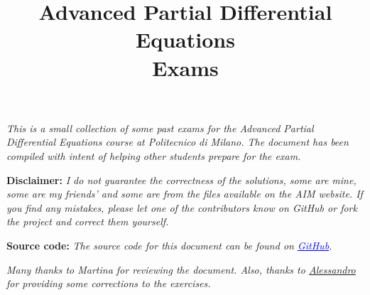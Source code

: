 \documentclass[a4paper,12pt]{article}
\begin{document}
\title{\textbf{Advanced Partial Differential Equations \\ Exams}}
\author{}
\date{}
\maketitle

\noindent\textit{This is a small collection of some past exams for the Advanced Partial Differential Equations course 
at Politecnico di Milano. The document has been compiled with intent of helping other students prepare for the exam.}

\vspace{0.5cm}

\textbf{Disclaimer:}
\textit{
I do not guarantee the correctness of the solutions, some are mine, some are my friends' and 
some are from the files available on the AIM website. If you find any mistakes, 
please let one of the contributors know on GitHub or fork the project and correct them yourself.}

\vspace{0.5cm}

\textbf{Source code:}
\textit{
The source code for this document can be found on \href{https://github.com/itsmebonny/APDE_Exams}{\textcolor{blue}{\underline{GitHub}}}.} 
\vspace{0.5cm}

\textit{Many thanks to Martina for reviewing the document. Also, thanks to \href{https://github.com/alessandropedone}{Alessandro} for providing some corrections to the exercises.}




\end{document}

